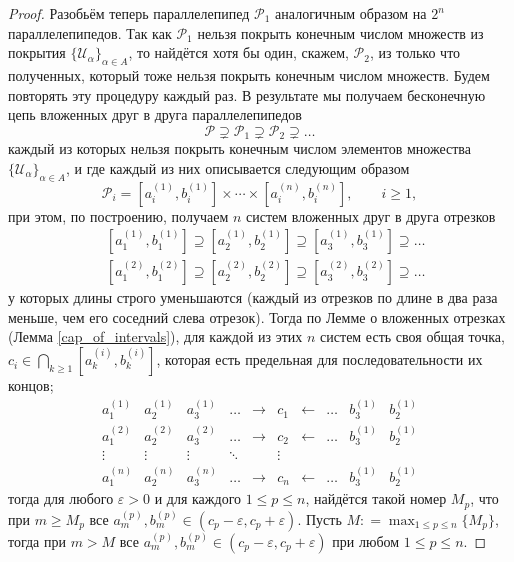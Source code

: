 \begin{proof}
Разобьём теперь параллелепипед $\mathcal{P}_1$ аналогичным образом на $2^n$ параллелепипедов. Так как $\mathcal{P}_1$ нельзя покрыть конечным числом множеств из покрытия $\{ \mathscr{U}_\alpha\}_{\alpha \in A}$, то найдётся хотя бы один, скажем, $\mathcal{P}_2$, из только что полученных, который тоже нельзя покрыть конечным числом множеств. Будем повторять эту процедуру каждый раз. В результате мы получаем бесконечную цепь вложенных друг в друга параллелепипедов 
\[
 \mathcal{P} \supsetneq \mathcal{P}_1 \supsetneq \mathcal{P}_2 \supsetneq \ldots
\]
каждый из которых нельзя покрыть конечным числом элементов множества $\{\mathscr{U}_\alpha\}_{\alpha \in A}$, и где каждый из них описывается следующим образом
\[
 \mathcal{P}_i = \left[a_i^{(1)}, b_i^{(1)} \right] \times \cdots \times \left[a_i^{(n)}, b_i^{(n)} \right], \qquad i \ge 1,
\]
при этом, по построению, получаем $n$ систем вложенных друг в друга отрезков
\begin{align*}
    & \left[ a_1^{(1)}, b_1^{(1)} \right] \supseteq \left[ a_2^{(1)}, b_2^{(1)} \right] \supseteq \left[ a_3^{(1)}, b_3^{(1)} \right] \supseteq \ldots \\
   & \left[ a_1^{(2)}, b_1^{(2)} \right] \supseteq \left[ a_2^{(2)}, b_2^{(2)} \right] \supseteq \left[ a_3^{(2)}, b_3^{(2)} \right] \supseteq \ldots 
\end{align*}
у которых длины строго уменьшаются (каждый из отрезков по длине в два раза меньше, чем его соседний слева отрезок). Тогда по Лемме о вложенных отрезках (Лемма \ref{cap_of_intervals}), для каждой из этих $n$ систем есть своя общая точка, $c_i \in \bigcap_{k \ge 1} [ a_k^{(i)}, b_k^{(i)} ] $, которая есть предельная для последовательности их концов; 
\[
 \begin{matrix}
    a_1^{(1)} & a_2^{(1)} & a_3^{(1)}& \ldots  & \to & c_1 & \leftarrow & \ldots & b_3^{(1)} & b_2^{(1)}  \\
    a_1^{(2)} & a_2^{(2)} & a_3^{(2)}& \ldots  & \to & c_2 & \leftarrow & \ldots & b_3^{(1)} & b_2^{(1)}  \\
    \vdots & \vdots &\vdots & \ddots && \vdots && && \\
    a_1^{(n)} & a_2^{(n)} & a_3^{(n)}& \ldots  & \to & c_n & \leftarrow & \ldots & b_3^{(1)} & b_2^{(1)}  
\end{matrix}
\]
тогда для любого $\varepsilon >0$ и для каждого $1\le p \le n$, найдётся такой номер $M_p$, что при $m \ge M_p$ все $a_m^{(p)}, b_m^{(p)} \in (c_p - \varepsilon, c_p + \varepsilon)$. Пусть $M: = \max_{1 \le p \le n}\{M_p\}$, тогда при $m > M$ все $a_m^{(p)}, b_m^{(p)} \in (c_p - \varepsilon, c_p + \varepsilon)$ при любом $1\le p \le n.$


\end{proof}
